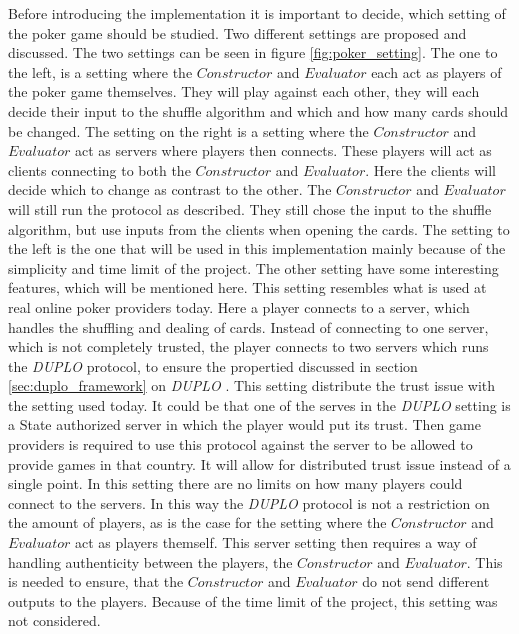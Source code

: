 \documentclass[twoside,11pt,openright]{report}
\newcommand{\DUPLO}{\textit{DUPLO} }
\begin{document}
Before introducing the implementation it is important to decide, which setting of the poker game should be studied. Two different settings are proposed and discussed. The two settings can be seen in figure \ref{fig:poker_setting}. The one to the left, is a setting where the $Constructor$ and $Evaluator$ each act as players of the poker game themselves. They will play against each other, they will each decide their input to the shuffle algorithm and which and how many cards should be changed. The setting on the right is a setting where the $Constructor$ and $Evaluator$ act as servers where players then connects. These players will act as clients connecting to both the $Constructor$ and $Evaluator$. Here the clients will decide which to change as contrast to the other. The $Constructor$ and $Evaluator$ will still run the protocol as described. They still chose the input to the shuffle algorithm, but use inputs from the clients when opening the cards. The setting to the left is the one that will be used in this implementation mainly because of the simplicity and time limit of the project. The other setting have some interesting features, which will be mentioned here. This setting resembles what is used at real online poker providers today. Here a player connects to a server, which handles the shuffling and dealing of cards. Instead of connecting to one server, which is not completely trusted, the player connects to two servers which runs the \DUPLO protocol, to ensure the propertied discussed in section \ref{sec:duplo_framework} on \DUPLO. This setting distribute the trust issue with the setting used today. It could be that one of the serves in the \DUPLO setting is a State authorized server in which the player would put its trust. Then game providers is required to use this protocol against the server to be allowed to provide games in that country. It will allow for distributed trust issue instead of a single point. In this setting there are no limits on how many players could connect to the servers. In this way the \DUPLO protocol is not a restriction on the amount of players, as is the case for the setting where the $Constructor$ and $Evaluator$ act as players themself. This server setting then requires a way of handling authenticity between the players, the $Constructor$ and $Evaluator$. This is needed to ensure, that the $Constructor$ and $Evaluator$ do not send different outputs to the players. Because of the time limit of the project, this setting was not considered.

\bigskip
\end{document}

